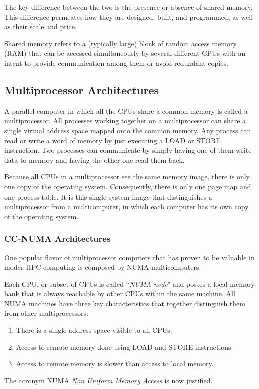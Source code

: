 \documentclass[a4paper,12pt]{article}
\begin{document}
The key difference between the two is the presence or absence of shared memory.
This difference permeates how they are designed, built, and programmed, as well as their scale and price\cite[p.586]{Tanenbaum}.

Shared memory refers to a (typically large) block of random access memory (RAM) that can be accessed simultaneously by several different CPUs with an intent to provide communication among them or avoid redundant copies.


\subsection{Multiprocessor Architectures}\label{sec:multiprocessor}
A parallel computer in which all the CPUs share a common memory is called a multiprocessor. 
All processes working together on a multiprocessor can share a single virtual address space mapped onto the common memory. 
Any process can read or write a word of memory by just executing a LOAD or STORE instruction.
Two processes can communicate by simply having one of them write data to memory and having the other one read them back.

Because all CPUs in a multiprocessor see the same memory image, there is only one copy of the operating system. 
Consequently, there is only one page map and one process table. 
It is this single-system image that distinguishes a multiprocessor from a multicomputer, in which each computer has its own copy of the operating system.

\subsubsection{CC-NUMA Architectures}
One popular flavor of multiprocessor computers that has proven to be valuable in moder HPC computing is composed by NUMA multicomputers.

Each CPU, or subset of CPUs is called ``\textit{NUMA node}" and posses a local memory bank that is always reachable by other CPUs within the same machine.
All NUMA machines have three key characteristics that together distinguish
them from other multiprocessors:
\begin{enumerate}
	\item There is a single address space visible to all CPUs.
	\item Access to remote memory done using LOAD and STORE instructions.
	\item Access to remote memory is slower than access to local memory.
\end{enumerate}
The acronym NUMA \textit{Non Uniform Memory Access} is now justified.
\end{document}
